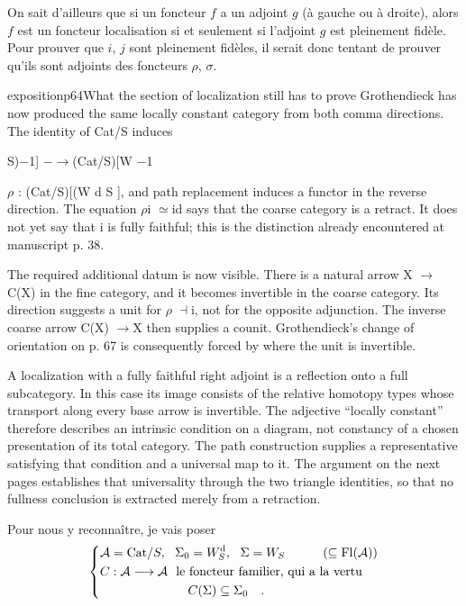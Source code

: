 On sait d'ailleurs que si un foncteur $f$ a un adjoint $g$ (à gauche ou à droite), alors $f$ est un foncteur localisation si et seulement si l'adjoint $g$ est pleinement fidèle. Pour prouver que $i$, $j$ sont pleinement fidèles, il serait donc tentant de prouver qu'ils sont adjoints des foncteurs $\rho$, $\sigma$.

\begin{dcomment}{exposition}{p64}{What the section of localization still has to prove}
Grothendieck has now produced the same locally constant category from both comma directions. The identity of Cat/S induces

S)\ensuremath{-}1] \ensuremath{-}\ensuremath{\to}(Cat/S)[W \ensuremath{-}1

\ensuremath{\rho} : (Cat/S)[(W d S ], and path replacement induces a functor in the reverse direction. The equation \ensuremath{\rho}i \ensuremath{\simeq}id says that the coarse category is a retract. It does not yet say that i is fully faithful; this is the distinction already encountered at manuscript p. 38.

The required additional datum is now visible. There is a natural arrow X \ensuremath{\to}C(X) in the fine category, and it becomes invertible in the coarse category. Its direction suggests a unit for \ensuremath{\rho} \ensuremath{\dashv}i, not for the opposite adjunction. The inverse coarse arrow C(X) \ensuremath{\to}X then supplies a counit. Grothendieck’s change of orientation on p. 67 is consequently forced by where the unit is invertible.

A localization with a fully faithful right adjoint is a reflection onto a full subcategory. In this case its image consists of the relative homotopy types whose transport along every base arrow is invertible. The adjective “locally constant” therefore describes an intrinsic condition on a diagram, not constancy of a chosen presentation of its total category. The path construction supplies a representative satisfying that condition and a universal map to it. The argument on the next pages establishes that universality through the two triangle identities, so that no fullness conclusion is extracted merely from a retraction.

\end{dcomment}


Pour nous y reconnaître, je vais poser
\[
\left\{
\begin{aligned}
&\cA=\Cat/S,\ \ \Sigma_0=W_S^{\mathrm{d}},\ \ \Sigma=W_S\qquad\quad(\subseteq\Fl(\cA))\\
&C:\cA\longrightarrow\cA\ \text{ le foncteur familier, qui a la vertu}\\
&\qquad\qquad\qquad\quad C(\Sigma)\subseteq\Sigma_0\quad.
\end{aligned}
\right.
\]

